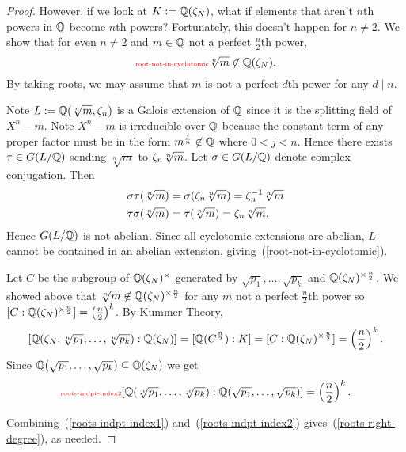 \begin{proof}
However, if we look at $K:=\mathbb{Q}(\zeta_N)$, what if elements that aren't $n$th powers in $\mathbb{Q}$ become $n$th powers? Fortunately, this doesn't happen for $n\ne 2$. We show that for even $n\ne 2$ and $m\in\mathbb{Q}$ not a perfect $\frac n2$th power,
\begin{equation}\llabel{root-not-in-cyclotomic}
\sqrt[n]{m}\nin \Q(\ze_N).
\end{equation}
By taking roots, we may assume that $m$ is not a perfect $d$th power for any $d\mid n$.

Note $L:=\mathbb{Q}(\sqrt[n]{m},\zeta_n)$ is a Galois extension of $\mathbb{Q}$ since it is the splitting field of $X^n-m$. Note $X^n-m$ is irreducible over $\mathbb{Q}$ because the constant term of any proper factor must be in the form $m^{\frac jn}\not\in \mathbb{Q}$ where $0<j<n$. Hence there exists $\tau\in G(L/\mathbb{Q})$ sending $\sqrt[n]{m}$ to $\zeta_n\sqrt[n]{m}$. 
Let $\sigma\in G(L/\mathbb{Q})$ denote complex conjugation. Then
\begin{align*}
\sigma\tau(\sqrt[n]{m})&=\sigma(\zeta_n\sqrt[n]{m})=\zeta_n^{-1}\sqrt[n]{m}\\
\tau\sigma(\sqrt[n]{m})&=\tau(\sqrt[n]{m})=\zeta_n\sqrt[n]{m}.
\end{align*}
Hence $G(L/\mathbb{Q})$ is not abelian. Since all cyclotomic extensions are abelian, $L$ cannot be contained in an abelian extension, giving~(\ref{root-not-in-cyclotomic}).

Let $C$ be the subgroup of $\mathbb{Q}(\zeta_N)^{\times}$ generated by $\sqrt{p_1},\ldots, \sqrt{p_k}$ and $\mathbb{Q}(\zeta_N)^{\times \frac n2}$. We showed above that $\sqrt[n]{m}\not\in\mathbb{Q}(\zeta_N)^{\times \frac{n}{2}}$ for any  $m$ not a perfect $\frac n2$th power so $[C:\mathbb{Q}(\zeta_N)^{\times \frac n2}]=\left( {\frac{n}{2}} \right)^k$. By Kummer Theory,
\[
[\mathbb{Q}(\zeta_N,\sqrt[n]{p_1},\ldots, \sqrt[n]{p_k}):\mathbb{Q}(\zeta_N)]=[\mathbb{Q}(C^{\frac n 2}):K]=[C:\mathbb{Q}(\zeta_N)^{\times \frac n2}]=\left( {\frac{n}{2}} \right)^k.
\]
Since $\mathbb{Q}(\sqrt{p_1},\ldots, \sqrt{p_k})\subseteq \mathbb{Q}(\zeta_N)$ we get
\begin{equation}\llabel{roots-indpt-index2}
[\Q(\sqrt[n]{p_1},\ldots, \sqrt[n]{p_k}):\Q(\sqrt{p_1},\ldots, \sqrt{p_k})]=\pf n2^k.
\end{equation}

Combining~(\ref{roots-indpt-index1}) and~(\ref{roots-indpt-index2}) gives~(\ref{roots-right-degree}), as needed.
\end{proof}

